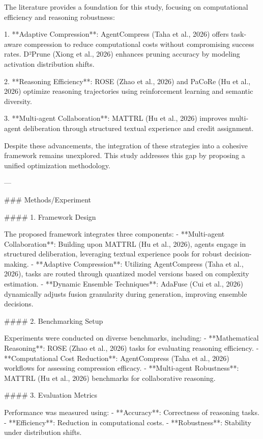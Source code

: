 The literature provides a foundation for this study, focusing on computational efficiency and reasoning robustness:

1. **Adaptive Compression**: AgentCompress (Taha et al., 2026) offers task-aware compression to reduce computational costs without compromising success rates. D²Prune (Xiong et al., 2026) enhances pruning accuracy by modeling activation distribution shifts.
   
2. **Reasoning Efficiency**: ROSE (Zhao et al., 2026) and PaCoRe (Hu et al., 2026) optimize reasoning trajectories using reinforcement learning and semantic diversity.
   
3. **Multi-agent Collaboration**: MATTRL (Hu et al., 2026) improves multi-agent deliberation through structured textual experience and credit assignment.

Despite these advancements, the integration of these strategies into a cohesive framework remains unexplored. This study addresses this gap by proposing a unified optimization methodology.

---

### Methods/Experiment

#### 1. Framework Design

The proposed framework integrates three components:
- **Multi-agent Collaboration**: Building upon MATTRL (Hu et al., 2026), agents engage in structured deliberation, leveraging textual experience pools for robust decision-making.
- **Adaptive Compression**: Utilizing AgentCompress (Taha et al., 2026), tasks are routed through quantized model versions based on complexity estimation.
- **Dynamic Ensemble Techniques**: AdaFuse (Cui et al., 2026) dynamically adjusts fusion granularity during generation, improving ensemble decisions.

#### 2. Benchmarking Setup

Experiments were conducted on diverse benchmarks, including:
- **Mathematical Reasoning**: ROSE (Zhao et al., 2026) tasks for evaluating reasoning efficiency.
- **Computational Cost Reduction**: AgentCompress (Taha et al., 2026) workflows for assessing compression efficacy.
- **Multi-agent Robustness**: MATTRL (Hu et al., 2026) benchmarks for collaborative reasoning.

#### 3. Evaluation Metrics

Performance was measured using:
- **Accuracy**: Correctness of reasoning tasks.
- **Efficiency**: Reduction in computational costs.
- **Robustness**: Stability under distribution shifts.

